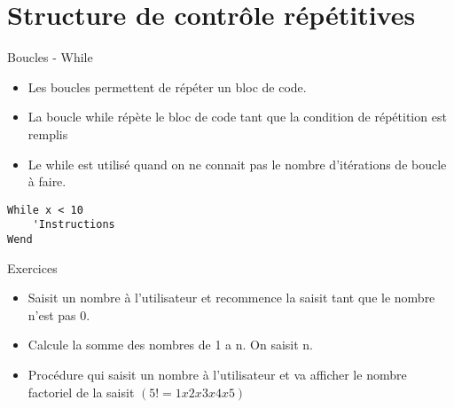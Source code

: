 \documentclass[aspectratio=169,usenames,dvipsnames]{beamer}
\begin{document}
    \section{Structure de contrôle répétitives}
    \begin{frame}[fragile]{Boucles - While}
        \begin{itemize}
            \item Les boucles permettent de répéter un bloc de code.
            \item La boucle while répète le bloc de code tant que la condition de répétition est remplis
            \item Le while est utilisé quand on ne connait pas le nombre d’itérations de boucle à faire.
        \end{itemize}
        \begin{lstlisting}
While x < 10
    'Instructions
Wend
        \end{lstlisting}
    \end{frame}
    \begin{frame}{Exercices}
        \begin{itemize}
            \item Saisit un nombre à l'utilisateur et recommence la saisit tant que le nombre n'est pas 0.
            \item Calcule la somme des nombres de 1 a n. On saisit n.
            \item Procédure qui saisit un nombre à l'utilisateur et va afficher le nombre factoriel de la saisit $(5! = 1x2x3x4x5)$

        \end{itemize}
    \end{frame}
\end{document}

